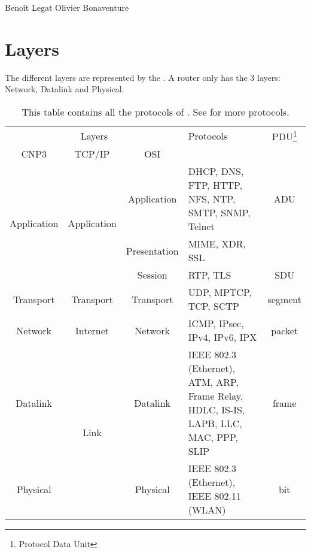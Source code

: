 

\usepackage{multirow}

{Benoît Legat}
{Olivier Bonaventure}

\section{Layers}

The different layers are represented by the .
A router only has the 3 layers: Network, Datalink and Physical.
\begin{table}[!ht]
  \centering
  \begin{tabular}{|c|c|c|p{4cm}|c|}
    \hline
    \multicolumn{3}{|c|}{Layers} & Protocols & PDU\footnote{Protocol Data Unit}\\
    \cline{1-3}
    CNP3 & TCP/IP & OSI & & \\
    \hline
    \multirow{3}{*}{Application} & \multirow{3}{*}{Application}             & Application  & DHCP, DNS, FTP, HTTP, NFS, NTP, SMTP, SNMP, Telnet & ADU\\
    \cline{3-5}
                                 &                                          & Presentation & MIME, XDR, SSL &\\
    \cline{3-5}
                                 &                                          & Session      & RTP, TLS & SDU\\
    \hline
    Transport                    & Transport                                & Transport    & UDP, MPTCP, TCP, SCTP & segment\\
    \hline
    Network                      & Internet                                 & Network      & ICMP, IPsec, IPv4, IPv6, IPX & packet\\
    \hline
    Datalink                     & \multirow{2}{*}{Link}                    & Datalink     & IEEE 802.3 (Ethernet), ATM, ARP, Frame Relay, HDLC, IS-IS, LAPB, LLC, MAC, PPP, SLIP & frame\\
    \cline{1-1}
    \cline{3-5}
    Physical                     &                                          & Physical     & IEEE 802.3 (Ethernet), IEEE 802.11 (WLAN) & bit\\
    \hline
  \end{tabular}
  \caption{This table contains all the protocols of \cite{bonaventure2011computer}. See \cite{wiki:osimodel} for more protocols.}
  \label{tab:layers}
\end{table}

